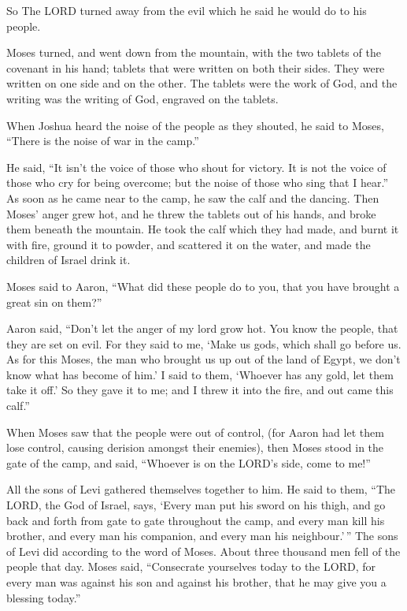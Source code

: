  So The LORD turned away from the evil which he said he
would do to his people.

 Moses turned, and went down from the mountain, with the
two tablets of the covenant in his hand; tablets that were written on
both their sides. They were written on one side and on the other.
 The tablets were the work of God, and the writing was the
writing of God, engraved on the tablets.

 When Joshua heard the noise of the people as they shouted,
he said to Moses, ``There is the noise of war in the camp.''

 He said, ``It isn't the voice of those who shout for
victory. It is not the voice of those who cry for being overcome; but
the noise of those who sing that I hear.''  As soon as he
came near to the camp, he saw the calf and the dancing. Then Moses'
anger grew hot, and he threw the tablets out of his hands, and broke
them beneath the mountain.  He took the calf which they had
made, and burnt it with fire, ground it to powder, and scattered it on
the water, and made the children of Israel drink it.

 Moses said to Aaron, ``What did these people do to you,
that you have brought a great sin on them?''

 Aaron said, ``Don't let the anger of my lord grow hot. You
know the people, that they are set on evil.  For they said
to me, `Make us gods, which shall go before us. As for this Moses, the
man who brought us up out of the land of Egypt, we don't know what has
become of him.'  I said to them, `Whoever has any gold, let
them take it off.' So they gave it to me; and I threw it into the fire,
and out came this calf.''

 When Moses saw that the people were out of control, (for
Aaron had let them lose control, causing derision amongst their
enemies),  then Moses stood in the gate of the camp, and
said, ``Whoever is on the LORD's side, come to me!''

All the sons of Levi gathered themselves together to him. 
He said to them, ``The LORD, the God of Israel, says, `Every man put his
sword on his thigh, and go back and forth from gate to gate throughout
the camp, and every man kill his brother, and every man his companion,
and every man his neighbour.'\,''  The sons of Levi did
according to the word of Moses. About three thousand men fell of the
people that day.  Moses said, ``Consecrate yourselves today
to the LORD, for every man was against his son and against his brother,
that he may give you a blessing today.''

